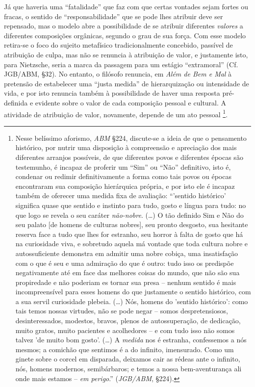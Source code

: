 \documentclass[
	12pt,				%
	openright,			%
	oneside,			%
	a4paper,			%
	english,			%
	french,				%
	spanish,			%
	brazil				%
	]{abntex2}
\begin{document}
Já que haveria uma “fatalidade” que faz com que certas vontades sejam fortes ou fracas, o sentido de “responsabilidade” que se pode lhes atribuir deve ser repensado, mas o modelo abre a possibilidade de se atribuir diferentes \textit{valores} a diferentes composições orgânicas, segundo o grau de sua força. Com esse modelo retira-se o foco do sujeito metafísico tradicionalmente concebido, passível de atribuição de culpa, mas não se renuncia à atribuição de valor, e justamente isto, para Nietzsche, seria a marca da passagem para um estágio “extramoral” (Cf. JGB/ABM, §32). No entanto, o filósofo renuncia, em \textit{Além de Bem e Mal} à pretensão de estabelecer uma “justa medida” de hierarquização ou intensidade de vida, e por isto renuncia também à possibilidade de haver uma resposta pré-definida e evidente sobre o valor de cada composição pessoal e cultural. A atividade de atribuição de valor, novamente, depende de um ato pessoal
\footnote{Nesse belíssimo aforismo, \textit{ABM} §224, discute-se a ideia de que o pensamento histórico, por nutrir uma disposição à compreensão e apreciação dos mais diferentes arranjos possíveis, de que diferentes povos e diferentes épocas são testemunho, é incapaz de proferir um “Sim” ou “Não” definitivo, isto é, condenar ou redimir definitivamente a forma como tais povos ou épocas encontraram sua composição hierárquica própria, e por isto ele é incapaz também de oferecer uma medida fixa de avaliação: “'sentido histórico' significa quase que sentido e instinto para tudo, gosto e língua para tudo: no que logo se revela o seu caráter \textit{não-nobre}. (…) O tão definido Sim e Não do seu palato [de homens de culturas nobres], seu pronto desgosto, sua hesitante reserva face a tudo que lhes for estranho, seu horror à falta de gosto que há na curiosidade viva, e sobretudo aquela má vontade que toda cultura nobre e autossuficiente demonstra em admitir uma nobre cobiça, uma insatisfação com o que é seu e uma admiração do que é outro: tudo isso os predispõe negativamente até em face das melhores coisas do mundo, que não são sua propiredade e não poderiam es tornar sua presa – nenhum sentido é mais incompreensível para esses homens do que justamente o sentido histórico, com a sua servil curiosidade plebeia. (…) Nós, homens do 'sentido histórico': como tais temos nossas virtudes, não se pode negar – somos despretensiosos, desinteressados, modestos, bravos, plenos de autossuperação, de dedicação, muito gratos, muito pacientes e acolhedores – e com tudo isso não somos talvez 'de muito bom gosto'. (…) A \textit{medida} nos é estranha, confessemos a nós mesmos; a comichão que sentimos é a do infinito, imensurado. Como um ginete sobre o corcel em disparada, deixamos cair as rédeas ante o infinito, nós, homens modernos, semibárbaros; e temos a nossa bem-aventurança ali onde mais estamos – \textit{em perigo}.” (\textit{JGB/ABM}, §224).}.
\end{document}
